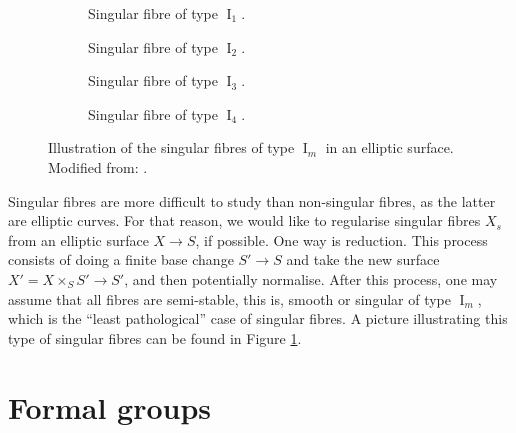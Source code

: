 \documentclass{report}
\DeclareMathOperator{\I}{I}
\theoremstyle{definition}
\begin{document}
\begin{figure}[!ht]
\begin{center}
\begin{subfigure}{0.45\textwidth}
\centering
{}
\caption{Singular fibre of type $\I_1$.}
\end{subfigure}
\begin{subfigure}{0.45\textwidth}
\centering
{}
\caption{Singular fibre of type $\I_2$.}
\end{subfigure}
\vspace{20mm}

\begin{subfigure}{0.45\textwidth}
\centering
{}
\caption{Singular fibre of type $\I_3$.}
\end{subfigure}
\begin{subfigure}{0.45\textwidth}
\centering
{}
\caption{Singular fibre of type $\I_4$.}
\end{subfigure}
\caption{Illustration of the singular fibres of type $\I_m$ in an elliptic surface. Modified from: \cite[Figure~5.1]{schuett2019mordell}.}
\label{fig:singular-fibres}
\end{center}
\end{figure} 

Singular fibres are more difficult to study than non-singular fibres, as the latter are elliptic curves. For that reason, we would like to regularise singular fibres $X_s$ from an elliptic surface $X\rightarrow S$, if possible. One way is reduction. This process consists of doing a finite base change $S'\rightarrow S$ and take the new surface $X'=X\times_SS'\rightarrow S'$, and then potentially normalise. After this process, one may assume that all fibres are semi-stable, this is, smooth or singular of type $\I_m$, which is the ``least pathological'' case of singular fibres. A picture illustrating this type of singular fibres can be found in Figure \ref{fig:singular-fibres}.

\chapter{Formal groups}
\label{Cha:formal-groups}
\end{document}
